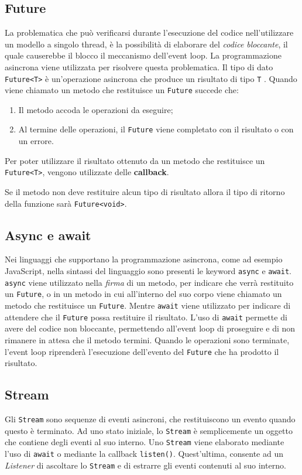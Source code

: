 \subsection{Future}
La problematica che può verificarsi durante l'esecuzione del codice nell'utilizzare un modello a singolo thread, è la possibilità di elaborare del \textit{codice bloccante}, il quale causerebbe il blocco il meccanismo dell'event loop. La programmazione asincrona viene utilizzata per risolvere questa problematica. Il tipo di dato \verb|Future<T>| è un’operazione asincrona che produce un risultato di tipo \verb|T| \cite{future_youtube}. Quando viene chiamato un metodo che restituisce un \verb|Future| succede che:
\begin{enumerate}
	\item Il metodo accoda le operazioni da eseguire;
	\item Al termine delle operazioni, il \verb|Future| viene completato con il risultato o con un
errore.
\end{enumerate}
Per poter utilizzare il risultato ottenuto da un metodo che restituisce un \verb|Future<T>|, vengono utilizzate delle \textbf{callback}.

Se il metodo non deve restituire alcun tipo di risultato allora il tipo di ritorno della funzione sarà \verb|Future<void>|.

\subsection{Async e await}
Nei linguaggi che supportano la programmazione asincrona, come ad esempio JavaScript, nella sintassi del linguaggio sono presenti le keyword \verb|async| e \verb|await|. \verb|async| viene utilizzato nella \textit{firma} di un metodo, per indicare che verrà restituito un \verb|Future|, o in un metodo in cui all'interno del suo corpo viene chiamato un metodo che restituisce un \verb|Future|. Mentre \verb|await| viene utilizzato per indicare di attendere che il \verb|Future| possa restituire il risultato. L'uso di \verb|await| permette di avere del codice non bloccante, permettendo all'event loop di proseguire e di non rimanere in attesa che il metodo termini. Quando le operazioni sono terminate, l'event loop riprenderà l'esecuzione dell'evento del \verb|Future| che ha prodotto il risultato.

\subsection{Stream}
Gli \verb|Stream| sono sequenze di eventi asincroni, che restituiscono un evento quando questo è terminato. Ad uno stato iniziale, lo \verb|Stream| è semplicemente un oggetto che contiene degli eventi al suo interno. Uno \verb|Stream| viene elaborato mediante l'uso di \verb|await| o mediante la callback \verb|listen()|. Quest'ultima, consente ad un \textit{Listener} di ascoltare lo \verb|Stream| e di estrarre gli eventi contenuti al suo interno.

